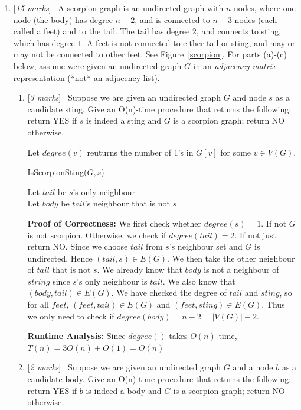 \documentclass[11pt]{article}
\newcommand{\Q}[1]{\medskip\item {[{\em #1 marks\/}]}\ }
\begin{document}
\begin{enumerate}
\Q{15} A scorpion graph is an undirected graph with $n$ nodes, where one node
(the body) has degree $n-2$, and is connected to $n-3$ nodes (each called a feet) and to the tail.
The tail has degree $2$, and connects to sting, which has degree $1$. A
feet is not connected to either tail or sting, and may or may not be connected to other feet.
See Figure~\ref{scorpion}. For parts (a)-(c) below, assume were given an undirected graph $G$ in an {\em adjacency matrix} representation (*not* an adjacency list).
  
\begin{enumerate}

\Q{3} Suppose we are given an undirected graph $G$ and node $s$ as a candidate sting. Give an O(n)-time procedure that returns the following: return YES if $s$ is indeed a sting and $G$ is a scorpion graph; return NO otherwise.

Let $degree(v)$ reuturns the number of 1's in $G[v]$ for some $v \in V(G)$.

\begin{algorithm}[h]
	\caption{IsScorpionSting($G, s$)}
	 {
	}
	Let $tail$ be $s$'s only neighbour\\
	Let $body$ be $tail$'s neighbour that is not $s$\\
	 {
	}
\end{algorithm}

\textbf{Proof of Correctness:} We first check whether $degree(s) = 1$. If not $G$ is not scorpion. Otherwise, 
we check if $degree(tail) = 2$. If not just return NO. Since we choose $tail$ from $s$'s neighbour set and 
$G$ is undirected. Hence $(tail,s) \in E(G)$. We then take the other neighbour of $tail$ that is not $s$. 
We already know that $body$ is not a neighbour of $string$ since $s$'s only neighbour is $tail$. We also 
know that $(body, tail) \in E(G)$. We have checked the degree of $tail$ and $sting$, so for all $feet$, 
$(feet, tail) \in E(G)$ and $(feet, sting) \in E(G)$. Thus we only need to check if 
$degree(body) = n - 2 = \lvert V(G) \rvert - 2$.

\textbf{Runtime Analysis:} Since $degree()$ takes $O(n)$ time, $T(n) = 3 O(n) + O(1) = O(n)$

\Q{2} Suppose we are given an undirected graph $G$ and a node $b$ as a candidate body. Give an O(n)-time procedure that returns the following: return YES if $b$ is indeed a body and $G$ is a scorpion graph; return NO otherwise.


\end{enumerate}
\end{enumerate}
\end{document}
